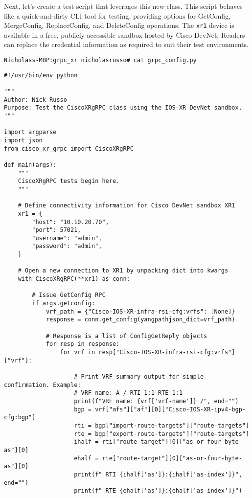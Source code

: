 Next, let's create a test script that leverages this new class. This script
behaves like a quick-and-dirty CLI tool for testing, providing options for
GetConfig, MergeConfig, ReplaceConfig, and DeleteConfig operations. The
\verb|xr1| device is available in a free, publicly-accessible sandbox
hosted by Cisco DevNet. Readers can replace the credential information
as required to suit their test environments.

\begin{verbatim}
Nicholass-MBP:grpc_xr nicholasrusso# cat grpc_config.py
\end{verbatim}

\begin{verbatim}
#!/usr/bin/env python

"""
Author: Nick Russo
Purpose: Test the CiscoXRgRPC class using the IOS-XR DevNet sandbox.
"""

import argparse
import json
from cisco_xr_grpc import CiscoXRgRPC

def main(args):
    """
    CiscoXRgRPC tests begin here.
    """

    # Define connectivity information for Cisco DevNet sandbox XR1
    xr1 = {
        "host": "10.10.20.70",
        "port": 57021,
        "username": "admin",
        "password": "admin",
    }

    # Open a new connection to XR1 by unpacking dict into kwargs
    with CiscoXRgRPC(**xr1) as conn:

        # Issue GetConfig RPC
        if args.getconfig:
            vrf_path = {"Cisco-IOS-XR-infra-rsi-cfg:vrfs": [None]}
            response = conn.get_config(yangpathjson_dict=vrf_path)

            # Response is a list of ConfigGetReply objects
            for resp in response:
                for vrf in resp["Cisco-IOS-XR-infra-rsi-cfg:vrfs"]["vrf"]:

                    # Print VRF summary output for simple confirmation. Example:
                    # VRF name: A / RTI 1:1 RTE 1:1
                    print(f"VRF name: {vrf['vrf-name']} /", end="")
                    bgp = vrf["afs"]["af"][0]["Cisco-IOS-XR-ipv4-bgp-cfg:bgp"]
                    rti = bgp["import-route-targets"]["route-targets"]
                    rte = bgp["export-route-targets"]["route-targets"]
                    ihalf = rti["route-target"][0]["as-or-four-byte-as"][0]
                    ehalf = rte["route-target"][0]["as-or-four-byte-as"][0]
                    print(f" RTI {ihalf['as']}:{ihalf['as-index']}", end="")
                    print(f" RTE {ehalf['as']}:{ehalf['as-index']}")


\end{verbatim}
